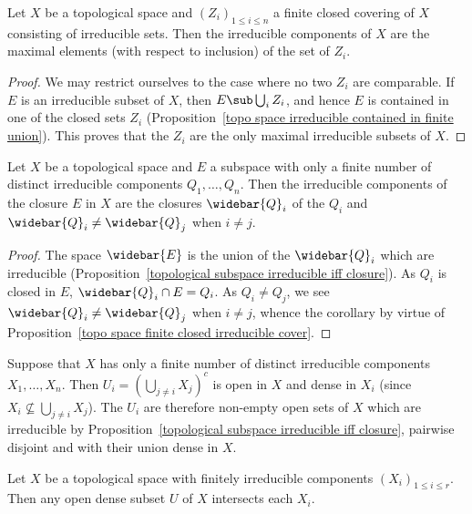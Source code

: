 \begin{proposition}\label{topo space finite closed irreducible cover}
Let $X$ be a topological space and $(Z_i)_{1\leq i\leq n}$ a finite closed covering of $X$ consisting of irreducible sets. Then the irreducible components of $X$ are the maximal elements (with respect to inclusion) of the set of $Z_i$.
\end{proposition}
\begin{proof}
We may restrict ourselves to the case where no two $Z_i$ are comparable. If $E$ is an irreducible subset of $X$, then $E\sub\bigcup_iZ_i$, and hence $E$ is contained in one of the closed sets $Z_i$ (Proposition~\ref{topo space irreducible contained in finite union}). This proves that the $Z_i$ are the only maximal irreducible subsets of $X$.
\end{proof}
\begin{corollary}\label{topo space subspace finite irre component prop}
Let $X$ be a topological space and $E$ a subspace with only a finite number of distinct irreducible components $Q_1,\dots,Q_n$. Then the irreducible components of the closure $E$ in $X$ are the closures $\widebar{Q}_i$ of the $Q_i$ and $\widebar{Q}_i\neq\widebar{Q}_j$ when $i\neq j$.
\end{corollary}
\begin{proof}
The space $\widebar{E}$ is the union of the $\widebar{Q}_i$ which are irreducible (Proposition~\ref{topological subspace irreducible iff closure}). As $Q_i$ is closed in $E$, $\widebar{Q}_i\cap E=Q_i$. As $Q_i\neq Q_j$, we see $\widebar{Q}_i\neq\widebar{Q}_j$ when $i\neq j$, whence the corollary by virtue of Proposition~\ref{topo space finite closed irreducible cover}.
\end{proof}
\begin{example}
Suppose that $X$ has only a finite number of distinct irreducible components $X_1,\dots,X_n$. Then $U_i=(\bigcup_{j\neq i}X_j)^c$ is open in $X$ and dense in $X_i$ (since $X_i\nsubseteq\bigcup_{j\neq i}X_j$). The $U_i$ are therefore non-empty open sets of $X$ which are irreducible by Proposition~\ref{topological subspace irreducible iff closure}, pairwise disjoint and with their union dense in $X$.
\end{example}
\begin{proposition}\label{topo space open dense intersect irre component}
Let $X$ be a topological space with finitely irreducible components $(X_i)_{1\leq i\leq r}$. Then any open dense subset $U$ of $X$ intersects each $X_i$.
\end{proposition}
